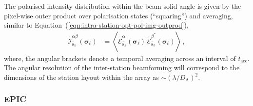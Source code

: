 \documentclass[
  journal=pasa,
  manuscript=article-type,
  year=2020,
  volume=37,
]{cup-journal}
\begin{document}
The polarised intensity distribution within the beam solid angle
is given by the pixel-wise outer product over polarisation states (``squaring'') and averaging, similar to Equation~(\ref{eqn:intra-station-opt-pol-img-outprod}),
\begin{align}
    \widetilde{\mathcal{I}}^{\alpha\beta}_{\hat{\boldsymbol{s}}_k}(\boldsymbol{\sigma}_\ell) &= \left\langle \widetilde{\mathcal{E}}_{\hat{\boldsymbol{s}}_k}^\alpha(\boldsymbol{\sigma}_\ell) \,  \widetilde{\mathcal{E}}_{\hat{\boldsymbol{s}}_k}^{\beta^*}(\boldsymbol{\sigma}_\ell) \right\rangle \, , \label{eqn:inter-station-opt-pol-img-outprod}
\end{align}
where, the angular brackets denote a temporal averaging across an interval of $t_\textrm{acc}$. The angular resolution of the inter-station beamforming will correspond to the dimensions of the station layout within the array as $\sim (\lambda/D_\textrm{A})^2$.

\subsubsection{EPIC}
\end{document}
